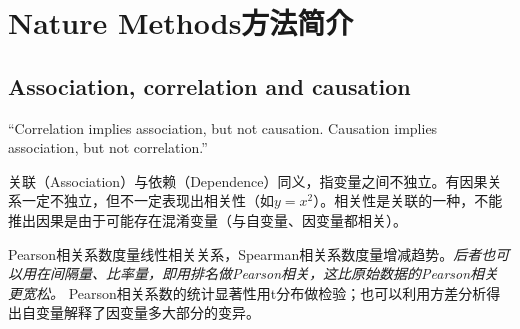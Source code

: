 
\chapter{Nature Methods方法简介}

\section{Association, correlation and causation}
\par ``Correlation implies association, but not causation. Causation implies association, but not
correlation.''
\par 关联（Association）与依赖（Dependence）同义，指变量之间不独立。有因果关系一定不独立，但不一定表现出相关性（如$y=x^2$）。相关性是关联的一种，不能推出因果是由于可能存在混淆变量（与自变量、因变量都相关）。
\par Pearson相关系数度量线性相关关系，Spearman相关系数度量增减趋势。\emph{后者也可以用在间隔量、比率量，即用排名做Pearson相关，这比原始数据的Pearson相关更宽松。} Pearson相关系数的统计显著性用t分布做检验；也可以利用方差分析得出自变量解释了因变量多大部分的变异。



